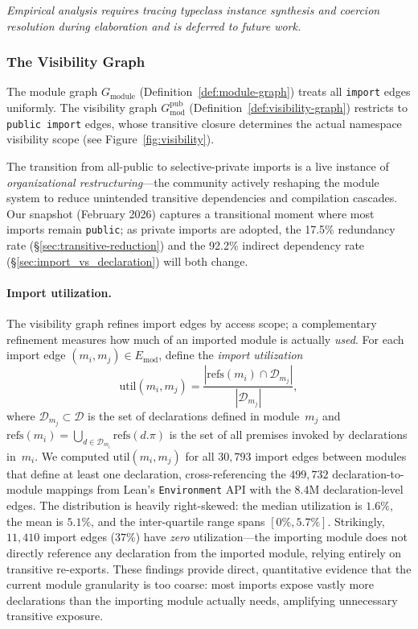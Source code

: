 \emph{Empirical analysis requires tracing typeclass instance synthesis and coercion resolution during elaboration and is deferred to future work.}

\subsubsection{The Visibility Graph}
\label{sec:visibility-graph}

The module graph $G_{\mathrm{module}}$ (Definition~\ref{def:module-graph}) treats all \texttt{import} edges uniformly. The visibility graph $G_{\mathrm{mod}}^{\mathrm{pub}}$ (Definition~\ref{def:visibility-graph}) restricts to \texttt{public import} edges, whose transitive closure determines the actual namespace visibility scope (see Figure~\ref{fig:visibility}).

The transition from all-public to selective-private imports is a live instance of \emph{organizational restructuring}---the community actively reshaping the module system to reduce unintended transitive dependencies and compilation cascades. Our snapshot (February 2026) captures a transitional moment where most imports remain \texttt{public}; as private imports are adopted, the 17.5\% redundancy rate (\S\ref{sec:transitive-reduction}) and the 92.2\% indirect dependency rate (\S\ref{sec:import_vs_declaration}) will both change.

\paragraph{Import utilization.}
The visibility graph refines import edges by access scope; a complementary refinement measures how much of an imported module is actually \emph{used}. For each import edge $(m_i, m_j) \in E_{\mathrm{mod}}$, define the \emph{import utilization}
\[
  \mathrm{util}(m_i, m_j) = \frac{|\mathrm{refs}(m_i) \cap \mathcal{D}_{m_j}|}{|\mathcal{D}_{m_j}|},
\]
where $\mathcal{D}_{m_j} \subset \mathcal{D}$ is the set of declarations defined in module~$m_j$ and $\mathrm{refs}(m_i) = \bigcup_{d \in \mathcal{D}_{m_i}} \mathrm{refs}(d.\pi)$ is the set of all premises invoked by declarations in~$m_i$. We computed $\mathrm{util}(m_i, m_j)$ for all $30{,}793$ import edges between modules that define at least one declaration, cross-referencing the $499{,}732$ declaration-to-module mappings from Lean's \texttt{Environment} API with the $8.4$M declaration-level edges. The distribution is heavily right-skewed: the median utilization is $1.6\%$, the mean is $5.1\%$, and the inter-quartile range spans $[0\%, 5.7\%]$. Strikingly, $11{,}410$ import edges ($37\%$) have \emph{zero} utilization---the importing module does not directly reference any declaration from the imported module, relying entirely on transitive re-exports. These findings provide direct, quantitative evidence that the current module granularity is too coarse: most imports expose vastly more declarations than the importing module actually needs, amplifying unnecessary transitive exposure.

